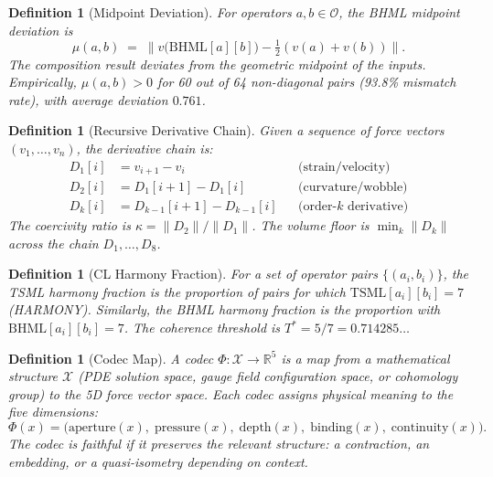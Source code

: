 \documentclass[11pt]{article}
\newtheorem{definition}[lemma]{Definition}
\theoremstyle{definition}
\begin{document}
\begin{definition}[Midpoint Deviation]
\label{def:midpoint-deviation}
For operators $a, b \in \mathcal{O}$, the \emph{BHML midpoint deviation} is
\[
  \mu(a,b) \;=\; \bigl\| v\bigl(\mathrm{BHML}[a][b]\bigr) - \tfrac{1}{2}(v(a) + v(b)) \bigr\|.
\]
The composition result deviates from the geometric midpoint of the inputs.
Empirically, $\mu(a,b) > 0$ for 60 out of 64 non-diagonal pairs (93.8\% mismatch rate),
with average deviation $0.761$.
\end{definition}

\begin{definition}[Recursive Derivative Chain]
\label{def:d-chain}
Given a sequence of force vectors $(v_1, \ldots, v_n)$, the derivative chain is:
\begin{align*}
  D_1[i] &= v_{i+1} - v_i & &\text{(strain/velocity)} \\
  D_2[i] &= D_1[i+1] - D_1[i] & &\text{(curvature/wobble)} \\
  D_k[i] &= D_{k-1}[i+1] - D_{k-1}[i] & &\text{(order-$k$ derivative)}
\end{align*}
The \emph{coercivity ratio} is $\kappa = \|D_2\| / \|D_1\|$.
The \emph{volume floor} is $\min_k \|D_k\|$ across the chain $D_1, \ldots, D_8$.
\end{definition}

\begin{definition}[CL Harmony Fraction]
\label{def:harmony-frac}
For a set of operator pairs $\{(a_i, b_i)\}$, the \emph{TSML harmony fraction} is the
proportion of pairs for which $\mathrm{TSML}[a_i][b_i] = 7$ (HARMONY).
Similarly, the \emph{BHML harmony fraction} is the proportion with $\mathrm{BHML}[a_i][b_i] = 7$.
The coherence threshold is $T^* = 5/7 = 0.714285\ldots$
\end{definition}

\begin{definition}[Codec Map]
\label{def:codec}
A \emph{codec} $\Phi: \mathcal{X} \to \mathbb{R}^5$ is a map from a mathematical structure
$\mathcal{X}$ (PDE solution space, gauge field configuration space, or cohomology group)
to the 5D force vector space.  Each codec assigns physical meaning to the five dimensions:
\[
  \Phi(x) = \bigl(\text{aperture}(x),\; \text{pressure}(x),\; \text{depth}(x),\;
  \text{binding}(x),\; \text{continuity}(x)\bigr).
\]
The codec is \emph{faithful} if it preserves the relevant structure: a contraction,
an embedding, or a quasi-isometry depending on context.
\end{definition}
\end{document}
